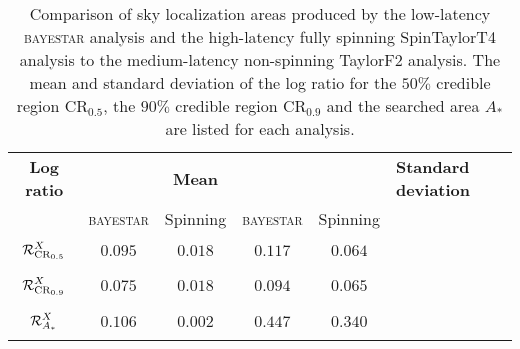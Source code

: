 \begin{table}
\begin{tabular}{ccccc}
\textbf{Log ratio} & & \textbf{Mean} & & & \textbf{Standard deviation} & \\   
 & \textsc{bayestar} & Spinning & \textsc{bayestar} & Spinning \\
$\displaystyle \vphantom{\frac{0}{0}} \mathcal{R}^X_{\mathrm{CR}_{0.5}}$ & $0.095$ & $0.018$ & $0.117$ & $0.064$ \\
$\displaystyle \vphantom{\frac{0}{0}} \mathcal{R}^X_{\mathrm{CR}_{0.9}}$ & $0.075$ & $0.018$ & $0.094$ & $0.065$ \\
$\displaystyle \vphantom{\frac{0}{0}} \mathcal{R}^X_{A_\ast}$ & $0.106$ & $0.002$ & $0.447$ & $0.340$
\end{tabular}
\caption{\label{tab:sky-ratio} Comparison of sky localization areas produced by the low-latency \textsc{bayestar} analysis and the high-latency fully spinning SpinTaylorT4 analysis to the medium-latency non-spinning TaylorF2 analysis. The mean and standard deviation of the log ratio for the $50\%$ credible region $\mathrm{CR}_{0.5}$, the $90\%$ credible region $\mathrm{CR}_{0.9}$ and the searched area $A_\ast$ are listed for each analysis.}

\end{table}